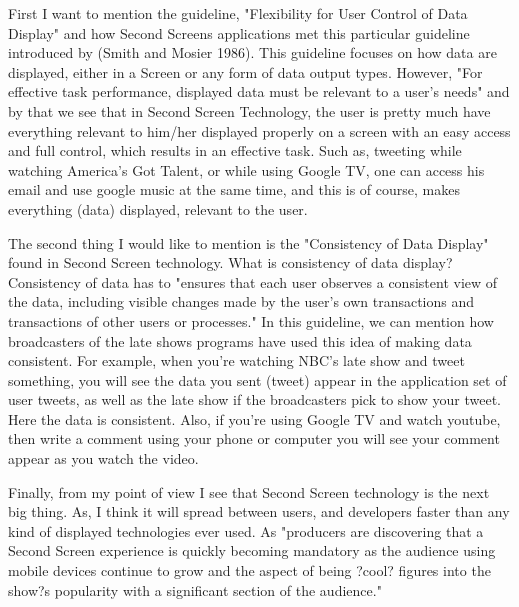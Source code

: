 \documentclass[12pt, oneside]{amsart}   	%
\begin{document}
 First I want to mention the guideline, "Flexibility for User Control of Data Display" and how Second Screens applications met this particular guideline introduced by (Smith and Mosier 1986).  This guideline focuses on how data are displayed, either in a Screen or any form of data output types.  However, "For effective task performance, displayed data must be relevant to a user's needs"\cite{Guideline} and by that we see that in Second Screen Technology, the user is pretty much have everything relevant to him/her displayed properly on a screen with an easy access and full control, which results in an effective task.  Such as, tweeting while watching America's Got Talent, or while using Google TV, one can access his email and use google music at the same time, and this is of course, makes everything (data) displayed, relevant to the user. 

 The second thing I would like to mention is the "Consistency of Data Display" found in Second Screen technology.  What is consistency of data display?   Consistency of data has to "ensures that each user observes a consistent view of the data, including visible changes made by the user's own transactions and transactions of other users or processes."\cite{guidline2} In this guideline, we can mention how broadcasters of the late shows programs have used this idea of making data consistent.  For example, when you're watching NBC's late show and tweet something, you will see the data you sent (tweet) appear in the application set of user tweets, as well as the late show if the broadcasters pick to show your tweet.  Here the data is consistent.  Also, if you're using Google TV and watch youtube, then write a comment using your phone or computer you will see your comment appear as you watch the video.

Finally, from my point of view I see that Second Screen technology is the next big thing.  As, I think it will spread between users, and developers faster than any kind of displayed technologies ever used. As "producers are discovering that a Second Screen experience is quickly becoming mandatory as the audience using mobile devices continue to grow and the aspect of being ?cool? figures into the show?s popularity with a significant section of the audience."\cite{Second-Screen-Art}
\end{document}
